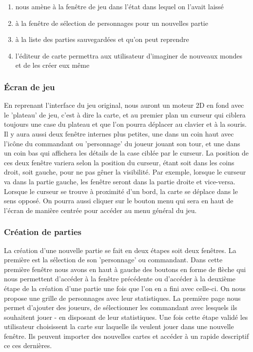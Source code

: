 \documentclass[a4paper,10pt]{article} %
\begin{document}
\begin{enumerate}[label=(\alph*)]
\item nous amène à la fenêtre de jeu dans l'état dans lequel on l'avait laissé
\item à la fenêtre de sélection de personnages pour un nouvelles partie
\item à la liste des parties sauvegardées et qu'on peut reprendre
\item l'éditeur de carte permettra aux utilisateur d'imaginer de nouveaux mondes et de les créer eux même
\end{enumerate}

\subsubsection{Écran de jeu}
En reprenant l'interface du jeu original, nous auront un moteur 2D en fond avec le 'plateau' de jeu, c'est à dire la carte, et au premier plan un curseur qui ciblera toujours une case du plateau et que l'on pourra déplacer au clavier et à la souris. Il y aura aussi deux fenêtre internes plus petites, une dans un coin haut avec l'icône du commandant ou 'personnage' du joueur jouant son tour, et une dans un coin bas qui affichera les détails de la case ciblée par le curseur. La position de ces deux fenêtre variera selon la position du curseur, étant soit dans les coins droit, soit gauche, pour ne pas gêner la visibilité. Par exemple, lorsque le curseur va dans la partie gauche, les fenêtre seront dans la partie droite et vice-versa. Lorsque le curseur se trouve à proximité d'un bord, la carte se déplace dans le sens opposé. On pourra aussi cliquer sur le bouton menu qui sera en haut de l'écran de manière centrée pour accéder au menu général du jeu.

\subsubsection{Création de parties}
La création d'une nouvelle partie se fait en deux étapes soit deux fenêtres. La première est la sélection de son 'personnage' ou commandant. Dans cette première fenêtre nous avons en haut à gauche des boutons en forme de flèche qui nous permettent d'accéder à la fenêtre précédente ou d'accéder à la deuxième étape de la création d'une partie une fois que l'on en a fini avec celle-ci. On nous propose une grille de personnages avec leur statistiques. La première page nous permet d'ajouter des joueurs, de sélectionner les commandant avec lesquels ils souhaitent jouer - en disposant de leur statistiques. Une fois cette étape validé les utilisateur choisissent la carte sur laquelle ils veulent jouer dans une nouvelle fenêtre. Ils peuvent importer des nouvelles cartes et accéder à un rapide descriptif ce ces dernières. 
\end{document}
